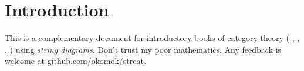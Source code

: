 \section{Introduction}


This is a complementary document for introductory books of category theory %
(\cite{AdamekHerrlichStrecker200908}%
, \cite{Awodey201008}%
, \cite{Borceux200804}%
, \cite{Lane201011}%
) using \emph{string diagrams}. %
Don't trust my poor mathematics. Any feedback is welcome at %
\href{https://github.com/okomok/strcat}{github.com/okomok/strcat}.  
